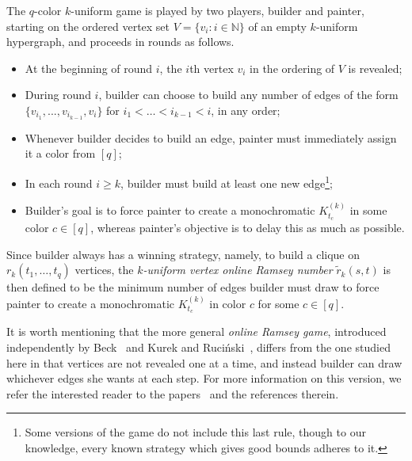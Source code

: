 \documentclass[A4paper,reqno,oneside,12pt]{amsart}
\theoremstyle{plain}
\theoremstyle{definition}
\newcommand{\N}{\mathbb{N}}
\begin{document}
The $q$-color $k$-uniform game is played by two players, builder and painter, starting on the ordered vertex set $V = \{v_i: i \in \N\}$ of an empty $k$-uniform hypergraph, and proceeds in rounds as follows. 
\begin{itemize}
    \item At the beginning of round $i$, the $i$th vertex $v_i$ in the ordering of $V$ is revealed;
    \item During round $i$, builder can choose to build any number of edges of the form\\
    $\{v_{i_1}, ..., v_{i_{k-1}}, v_i\}$ for $i_1 < \dots < i_{k-1} < i$, in any order;
    \item Whenever builder decides to build an edge, painter must immediately assign it a color from $[q]$;
    \item In each round $i \geq k$, builder must build at least one new edge\footnote{Some versions of the game do not include this last rule, though to our knowledge, every known strategy which gives good bounds adheres to it.};
    \item Builder's goal is to force painter to create a monochromatic $K_{t_c}^{(k)}$ in some color $c \in [q]$, whereas painter's objective is to delay this as much as possible.
\end{itemize}
Since builder always has a winning strategy, namely, to build a clique on $r_k(t_1, \dots, t_q)$ vertices, the {\it $k$-uniform vertex online Ramsey number} $\tilde{r}_k(s,t)$ is then defined to be the minimum number of edges builder must draw to force painter to create a monochromatic $K_{t_c}^{(k)}$ in color $c$ for some $c \in [q]$.

It is worth mentioning that the more general {\it online Ramsey game}, introduced independently by Beck~\cite{B93} and Kurek and Ruci\'nski~\cite{KR05}, differs from the one studied here in that vertices are not revealed one at a time, and instead builder can draw whichever edges she wants at each step. 
For more information on this version, we refer the interested reader to the papers~\cite{C09, CFGH19} and the references therein.
\end{document}
